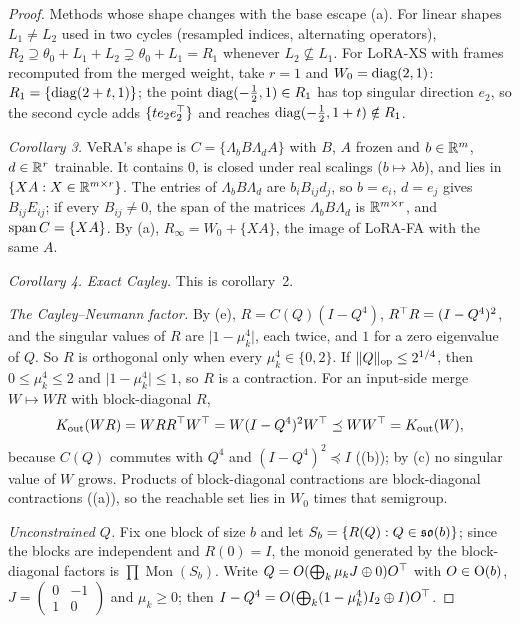 \begin{proof}
Methods whose shape changes with the base escape (a). For linear shapes $L_1\ne L_2$ used in two cycles (resampled indices,
alternating operators), $R_2\supseteq\theta_0+L_1+L_2\supsetneq\theta_0+L_1=R_1$ whenever $L_2\not\subseteq L_1$. For LoRA-XS
with frames recomputed from the merged weight, take $r=1$ and $W_0=\operatorname{diag}(2,1)$: $R_1=\{\operatorname{diag}(2+t,1)\}$; the point
$\operatorname{diag}(-\tfrac12,1)\in R_1$ has top singular direction $e_2$, so the second cycle adds $\{te_2e_2^{\top}\}$ and reaches
$\operatorname{diag}(-\tfrac12,1+t)\notin R_1$.

\emph{Corollary 3.} VeRA's shape is $C=\{\Lambda_bB\Lambda_dA\}$ with $B$, $A$ frozen and $b\in\mathbb{R}^m$, $d\in\mathbb{R}^r$ trainable. It
contains $0$, is closed under real scalings ($b\mapsto\lambda b$), and lies in $\{XA:X\in\mathbb{R}^{m\times r}\}$. The entries of
$\Lambda_bB\Lambda_d$ are $b_iB_{ij}d_j$, so $b=e_i$, $d=e_j$ gives $B_{ij}E_{ij}$; if every $B_{ij}\ne0$, the span of the
matrices $\Lambda_bB\Lambda_d$ is $\mathbb{R}^{m\times r}$, and $\operatorname{span} C=\{XA\}$. By (a), $R_\infty=W_0+\{XA\}$, the image of
LoRA-FA with the same $A$.

\emph{Corollary 4.} \emph{Exact Cayley.} This is corollary~2.

\emph{The Cayley--Neumann factor.} By (e), $R=C(Q)(I-Q^4)$, $R^{\top} R=(I-Q^4)^2$, and the singular values of $R$ are
$\lvert1-\mu_k^4\rvert$, each twice, and $1$ for a zero eigenvalue of $Q$. So $R$ is orthogonal only when every $\mu_k^4\in
\{0,2\}$. If $\lVert Q\rVert_{\rm op}\le2^{1/4}$, then $0\le\mu_k^4\le2$ and $\lvert1-\mu_k^4\rvert\le1$, so $R$ is a contraction.
For an input-side merge $W\mapsto WR$ with block-diagonal $R$,
\[K_{\rm out}(WR)=WRR^{\top} W^{\top}=W(I-Q^4)^2W^{\top}\preceq WW^{\top}=K_{\rm out}(W),\]
because $C(Q)$ commutes with $Q^4$ and $(I-Q^4)^2\preceq I$ ((b)); by (c) no singular value of $W$
grows. Products of block-diagonal contractions are block-diagonal contractions ((a)), so the reachable set lies
in $W_0$ times that semigroup.

\emph{Unconstrained $Q$.} Fix one block of size $b$ and let $S_b=\{R(Q):Q\in\mathfrak{so}(b)\}$; since the blocks are independent and
$R(0)=I$, the monoid generated by the block-diagonal factors is $\prod\operatorname{Mon}(S_b)$. Write $Q=O(\bigoplus_k\mu_kJ
\oplus0)O^{\top}$ with $O\in\mathrm{O}(b)$, $J=\left(\begin{smallmatrix}0&-1\\1&0\end{smallmatrix}\right)$ and $\mu_k\ge0$; then
$I-Q^4=O(\bigoplus_k(1-\mu_k^4)I_2\oplus I)O^{\top}$.


\end{proof}

